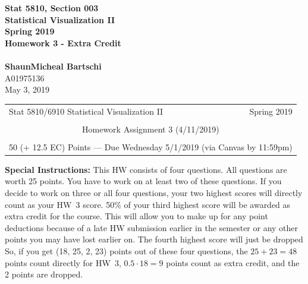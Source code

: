 \documentclass[12pt,letterpaper,final]{article}
\begin{document}


\begin{titlepage}
\vspace*{4.5cm}
\begin{center}
{\LARGE \bf Stat 5810, Section 003} \\[0.5cm]
{\LARGE \bf Statistical Visualization II} \\[0.5cm]
{\LARGE \bf Spring 2019} \\[0.5cm]
{\LARGE \bf Homework 3 - Extra Credit} \\[0.5cm]
~ \\[2cm]
{\bf ShaunMicheal Bartschi} \\[0.3cm]
{A01975136} \\[0.3cm]
{May 3, 2019} \\[0.3cm]
\end{center}

\thispagestyle{empty}
\vfill
\end{titlepage}

\begin{table}\centering
\begin{tabular*}{6.15in}{@{\extracolsep{\fill}}|llr|} \hline
Stat 5810/6910 Statistical Visualization II  & \hspace*{0.5 in} & Spring 2019 \\
 & & \\
\multicolumn{3}{|c|}{
Homework Assignment 3 (4/11/2019)} \\
 & & \\
\multicolumn{3}{|c|}{
50 (+ 12.5 EC) Points --- Due Wednesday 5/1/2019 (via Canvas by 11:59pm)} \\
\hline
\end{tabular*}
\end{table}


{\Large \bf Special Instructions:} 
This HW consists of four questions. All questions are worth 25 points. You have to work
on at least two of these questions. If you decide to work on three or all four
questions, your two highest scores will directly count as your HW~3 score.
50\% of your third highest score will be awarded as extra credit for the course.
This will allow you to make up for any point deductions because of a late HW
submission earlier in the semester or any other points you may have lost
earlier on. The fourth highest score will just be dropped So, if you get
(18, 25, 2, 23) points out of these four questions, the $25 + 23 = 48$ points
count directly for HW~3, $0.5 \cdot 18 = 9$ points count as extra credit,
and the 2 points are dropped.
\end{document}
